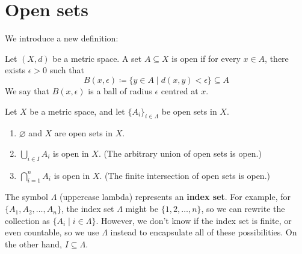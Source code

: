 \section{Open sets}
We introduce a new definition:
\begin{definition}
  Let $(X, d)$ be a metric space. A set $A \subseteq X$ is open if for every $x \in A$, there exists $\epsilon > 0$ such that
  \[
    B(x, \epsilon) \coloneqq \{ y \in A \; | \; d(x, y) < \epsilon \} \subseteq A
  \]
  We say that $B(x, \epsilon)$ is a ball of radius $\epsilon$ centred at $x$.
\end{definition}
\begin{theorem}
  \label{thm:topological-prop-open-sets}
  Let $X$ be a metric space, and let $\{A_i\}_{i \in \Lambda}$ be open sets in $X$.
  \begin{enumerate}
    \item $\varnothing$ and $X$ are open sets in $X$.
    \item $\bigcup_{i \in I} A_i$ is open in $X$. (The arbitrary union of open sets is open.)
    \item $\bigcap_{i = 1}^{n} A_i$ is open in $X$. (The finite intersection of open sets is open.)
  \end{enumerate}
\end{theorem}
\begin{remark}
  The symbol $\Lambda$ (uppercase lambda) represents an \textbf{index set}. For example, for $\{A_1, A_2, \ldots, A_n\}$, the index set $\Lambda$ might be $\{1, 2, \ldots, n\}$, so we can rewrite the collection as $\{A_i \; | \; i \in \Lambda\}$. However, we don't know if the index set is finite, or even countable, so we use $\Lambda$ instead to encapsulate all of these possibilities. On the other hand, $I \subseteq \Lambda$.
\end{remark}
